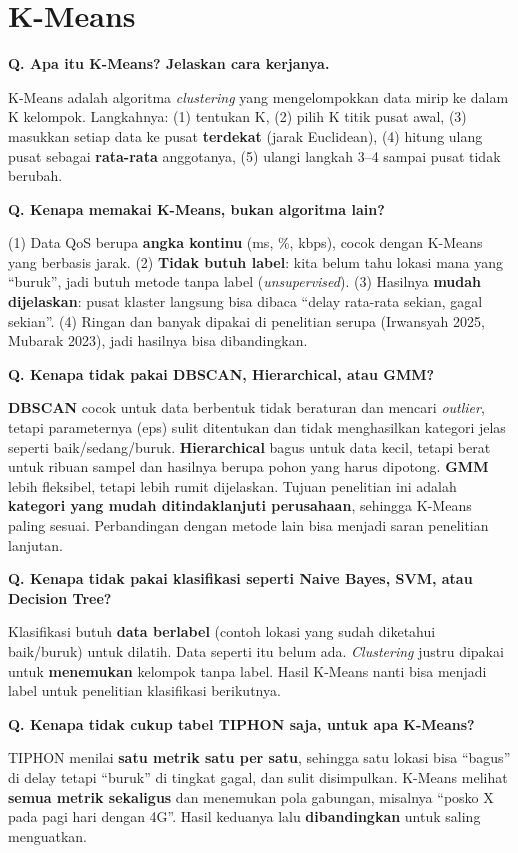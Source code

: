 \documentclass[11pt,a4paper]{article}
\newcounter{q}
\newcommand{\tanya}[2]{\stepcounter{q}%
\par\vspace{6pt}\noindent\colorbox{band}{\parbox{\dimexpr\linewidth-2\fboxsep}{\textbf{Q\arabic{q}. #1}}}\par\vspace{2pt}#2\par}
\begin{document}
\section{K-Means}

\tanya{Apa itu K-Means? Jelaskan cara kerjanya.}{K-Means adalah algoritma \textit{clustering} yang mengelompokkan data mirip ke dalam K kelompok. Langkahnya: (1) tentukan K, (2) pilih K titik pusat awal, (3) masukkan setiap data ke pusat \textbf{terdekat} (jarak Euclidean), (4) hitung ulang pusat sebagai \textbf{rata-rata} anggotanya, (5) ulangi langkah 3--4 sampai pusat tidak berubah.}

\tanya{Kenapa memakai K-Means, bukan algoritma lain?}{(1) Data QoS berupa \textbf{angka kontinu} (ms, \%, kbps), cocok dengan K-Means yang berbasis jarak. (2) \textbf{Tidak butuh label}: kita belum tahu lokasi mana yang ``buruk'', jadi butuh metode tanpa label (\textit{unsupervised}). (3) Hasilnya \textbf{mudah dijelaskan}: pusat klaster langsung bisa dibaca ``delay rata-rata sekian, gagal sekian''. (4) Ringan dan banyak dipakai di penelitian serupa (Irwansyah 2025, Mubarak 2023), jadi hasilnya bisa dibandingkan.}

\tanya{Kenapa tidak pakai DBSCAN, Hierarchical, atau GMM?}{\textbf{DBSCAN} cocok untuk data berbentuk tidak beraturan dan mencari \textit{outlier}, tetapi parameternya (eps) sulit ditentukan dan tidak menghasilkan kategori jelas seperti baik/sedang/buruk. \textbf{Hierarchical} bagus untuk data kecil, tetapi berat untuk ribuan sampel dan hasilnya berupa pohon yang harus dipotong. \textbf{GMM} lebih fleksibel, tetapi lebih rumit dijelaskan. Tujuan penelitian ini adalah \textbf{kategori yang mudah ditindaklanjuti perusahaan}, sehingga K-Means paling sesuai. Perbandingan dengan metode lain bisa menjadi saran penelitian lanjutan.}

\tanya{Kenapa tidak pakai klasifikasi seperti Naive Bayes, SVM, atau Decision Tree?}{Klasifikasi butuh \textbf{data berlabel} (contoh lokasi yang sudah diketahui baik/buruk) untuk dilatih. Data seperti itu belum ada. \textit{Clustering} justru dipakai untuk \textbf{menemukan} kelompok tanpa label. Hasil K-Means nanti bisa menjadi label untuk penelitian klasifikasi berikutnya.}

\tanya{Kenapa tidak cukup tabel TIPHON saja, untuk apa K-Means?}{TIPHON menilai \textbf{satu metrik satu per satu}, sehingga satu lokasi bisa ``bagus'' di delay tetapi ``buruk'' di tingkat gagal, dan sulit disimpulkan. K-Means melihat \textbf{semua metrik sekaligus} dan menemukan pola gabungan, misalnya ``posko X pada pagi hari dengan 4G''. Hasil keduanya lalu \textbf{dibandingkan} untuk saling menguatkan.}
\end{document}
